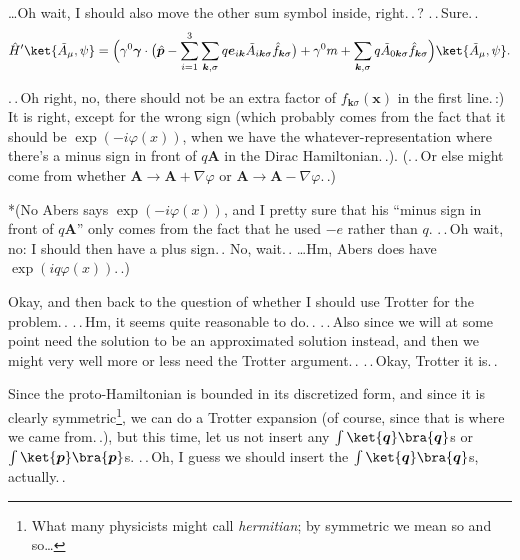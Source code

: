 \documentclass{report}
\begin{document}
\ldots Oh wait, I should also move the other sum symbol inside, right.\,.\,? .\,.\,Sure.\,.
\begin{align}
	\hat H' \ket{\tilde A_\mu, \psi} = 
		\Big(
				\gamma^0 \boldsymbol \gamma \cdot \big(
					\hat{\boldsymbol p\,}\! - 
						\sum_{i=1}^{3} \sum_{\boldsymbol{k}, \sigma}
						q\boldsymbol{e}_{i\boldsymbol{k}} 
						\tilde A_{i\boldsymbol{k}\sigma}
						\hat f_{\boldsymbol{k}\sigma}
				\big) +
				\gamma^0 m + 
				\sum_{\boldsymbol{k}, \sigma}
				q\tilde A_{0\boldsymbol{k}\sigma}
				\hat f_{\boldsymbol{k}\sigma}
		\Big)
		\ket{\tilde A_\mu, \psi}.
	\label{H'(A-tilde)_02}
\end{align}

.\,.\,Oh right, no, there should not be an extra factor of $f_{\boldsymbol{k}\sigma}(\boldsymbol{x})$ in the first line.\,:) It is right, except for the wrong sign (which probably comes from the fact that it should be $\exp(-i\varphi(x))$, when we have the whatever-representation where there's a minus sign in front of $q\boldsymbol{A}$ in the Dirac Hamiltonian.\,.). (.\,.\,Or else might come from whether $\boldsymbol{A}\to \boldsymbol{A} + \nabla \varphi$ or $\boldsymbol{A}\to \boldsymbol{A} - \nabla \varphi$.\,.)

*(No Abers says $\exp(-i\varphi(x))$, and I pretty sure that his ``minus sign in front of $q\boldsymbol{A}$'' only comes from the fact that he used $-e$ rather than $q$. .\,.\,Oh wait, no: I should then have a plus sign.\,. No, wait.\,. \ldots Hm, Abers does have $\exp(iq\varphi(x))$.\,.)

Okay, and then back to the question of whether I should use Trotter for the problem.\,. .\,.\,Hm, it seems quite reasonable to do.\,. .\,.\,Also since we will at some point need the solution to be an approximated solution instead, and then we might very well more or less need the Trotter argument.\,. .\,.\,Okay, Trotter it is.\,. 

Since the proto-Hamiltonian is bounded in its discretized form, and since it is clearly symmetric\footnote{What many physicists might call \emph{hermitian}; by symmetric we mean so and so\ldots}, we can do a Trotter expansion (of course, since that is where we came from.\,.), but this time, let us not insert any $\int\ket{\boldsymbol{q}}\bra{\boldsymbol{q}}$s or $\int\ket{\boldsymbol{p}}\bra{\boldsymbol{p}}$s. .\,.\,Oh, I guess we should insert the $\int\ket{\boldsymbol{q}}\bra{\boldsymbol{q}}$s, actually.\,. 
\end{document}
